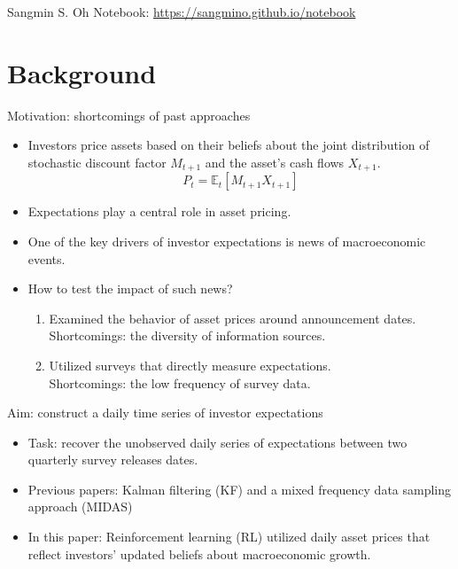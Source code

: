 \documentclass[UTF8, 16pt]{beamer}
\begin{document}
\begin{CJK*}{UTF8}{gbsn}
\begin{frame}{Sangmin S. Oh}
	\center Notebook: \href{https://sangmino.github.io/notebook}{https://sangmino.github.io/notebook}
\end{frame}

\section{Background}

\begin{frame}{Motivation: shortcomings of past approaches}
	\begin{itemize}
		\item Investors price assets based on their \alert{beliefs} about the joint distribution of \alert{stochastic discount factor $M_{t+1}$} and the \alert{asset’s cash flows $X_{t+1}$}. 
		$$P_{t}=\mathbb{E}_{t}\left[M_{t+1} X_{t+1}\right]$$
		\item \alert{Expectations} play a central role in asset pricing.
		\item One of the key drivers of investor \alert{expectations} is \alert{news of macroeconomic events}.
		\item How to test the impact of such \alert{news}?
			\begin{enumerate}
				\item Examined the behavior of asset prices around announcement dates.
					\\ \alert{Shortcomings: the diversity of information sources.}
				\item Utilized surveys that directly measure expectations.
					\\ \alert{Shortcomings: the low frequency of survey data.}
			\end{enumerate}
	\end{itemize}
\end{frame}

\begin{frame}{Aim: construct a daily time series of investor expectations}
	\begin{itemize}
		\item Task:  recover the unobserved \alert{daily series of expectations} between two quarterly survey releases dates.
		\item Previous papers: Kalman filtering (\alert{KF}) and a mixed frequency data sampling approach (\alert{MIDAS})
		\item In this paper: Reinforcement learning (\alert{RL}) utilized \alert{daily asset prices} that reflect investors’ \alert{updated beliefs} about \alert{macroeconomic growth}.
	\end{itemize}
\end{frame}


\end{CJK*}
\end{document}

